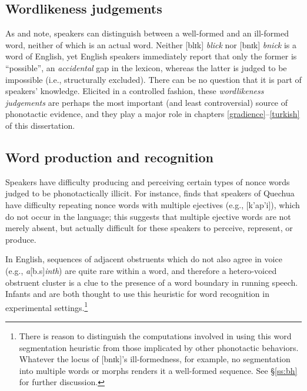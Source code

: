 \subsection{Wordlikeness judgements}

As \citet{Halle1962} and \citet{Chomsky1965} note, speakers can distinguish between a well-formed and an ill-formed word, neither of which is an actual word.
Neither [blɪk] \emph{blick} nor [bnɪk] \emph{bnick} is a word of English, yet English speakers immediately report that only the former is ``possible'', an \emph{accidental} gap in the lexicon, whereas the latter is judged to be impossible (i.e., structurally excluded).
There can be no question that it is part of speakers' knowledge.
Elicited in a controlled fashion, these \emph{wordlikeness judgements} are perhaps the most important (and least controversial) source of phonotactic evidence, and they play a major role in chapters \ref{gradience}--\ref{turkish} of this dissertation.

\subsection{Word production and recognition}
\label{ss:wpr}

Speakers have difficulty producing \citep[e.g.,][]{Davidson2006a,Davidson2010,Rose2007,Vitevitch1997} and perceiving \citep{Dupoux1999,Kabak2007a,Massaro1983} certain types of nonce words judged to be phonotactically illicit.
For instance, \citet{GallagherInPress} finds that speakers of Quechua have difficulty repeating nonce words with multiple ejectives (e.g., [k'ap'i]), which do not occur in the language; this suggests that 
multiple ejective words are not merely absent, but actually difficult for these speakers to perceive, represent, or produce.

In English, sequences of adjacent obstruents which do not also agree in voice (e.g., \emph{a}[b.s]\emph{inth}) are quite rare within a word, and therefore a hetero-voiced obstruent cluster is a clue to the presence of a word boundary in running speech.
Infants \citep[e.g.,][]{Mattys2001b} and \citep{McQueen1998b,Norris1997} are both thought to use this heuristic for word recognition in experimental settings.\footnote{
    There is reason to distinguish the computations involved in using this word segmentation heuristic from those implicated by other phonotactic behaviors.
    Whatever the locus of [bnɪk]'s ill-formedness, for example, no segmentation into multiple words or morphs renders it a well-formed sequence.
    See \S\ref{ss:bh} for further discussion.}

